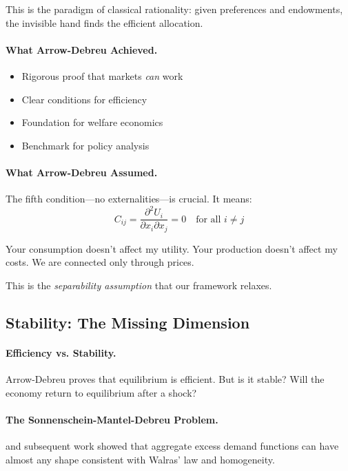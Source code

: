 This is the paradigm of classical rationality:
given preferences and endowments, the invisible hand finds the efficient allocation.

\paragraph{What Arrow-Debreu Achieved.}
\begin{itemize}
  \item Rigorous proof that markets \emph{can} work
  \item Clear conditions for efficiency
  \item Foundation for welfare economics
  \item Benchmark for policy analysis
\end{itemize}

\paragraph{What Arrow-Debreu Assumed.}
The fifth condition---no externalities---is crucial.
It means:
\begin{equation}
  C_{ij} = \frac{\partial^2 U_i}{\partial x_i \partial x_j} = 0 
  \quad \text{for all } i \neq j
\end{equation}

Your consumption doesn't affect my utility.
Your production doesn't affect my costs.
We are connected only through prices.

This is the \emph{separability assumption} that our framework relaxes.

\subsection{Stability: The Missing Dimension}

\paragraph{Efficiency vs. Stability.}
Arrow-Debreu proves that equilibrium is efficient.
But is it stable? Will the economy return to equilibrium after a shock?

\paragraph{The Sonnenschein-Mantel-Debreu Problem.}
\citet{sonnenschein1972} and subsequent work showed that
aggregate excess demand functions can have almost any shape
consistent with Walras' law and homogeneity.


